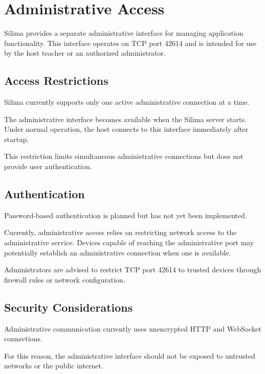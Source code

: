 \section{Administrative Access}

Silima provides a separate administrative interface for
managing application functionality. This interface operates
on TCP port 42614 and is intended for use by the host
teacher or an authorized administrator.

\subsection{Access Restrictions}

Silima currently supports only one active administrative
connection at a time.

The administrative interface becomes available when the
Silima server starts. Under normal operation, the host
connects to this interface immediately after startup.

This restriction limits simultaneous administrative
connections but does not provide user authentication.

\subsection{Authentication}

Password-based authentication is planned but has not
yet been implemented.

Currently, administrative access relies on restricting
network access to the administrative service. Devices
capable of reaching the administrative port may
potentially establish an administrative connection
when one is available.

Administrators are advised to restrict TCP port 42614
to trusted devices through firewall rules or network
configuration.

\subsection{Security Considerations}

Administrative communication currently uses unencrypted
HTTP and WebSocket connections.

For this reason, the administrative interface should
not be exposed to untrusted networks or the public
internet.
